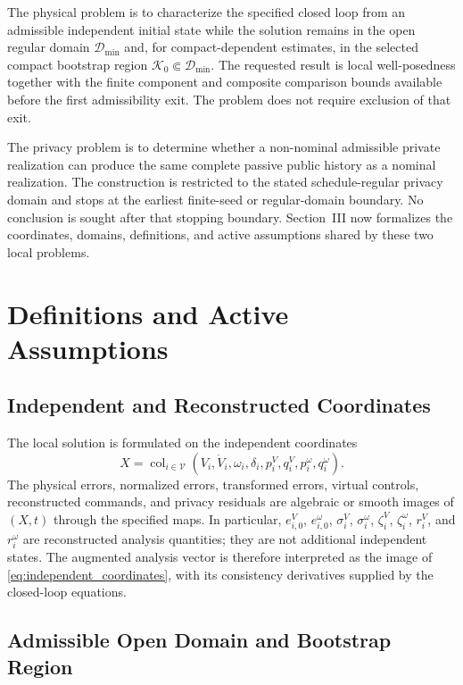 \documentclass[journal]{IEEEtran}
\begin{document}
The physical problem is to characterize the specified closed loop from an admissible independent initial state while the solution remains in the open regular domain $\mathcal D_{\min}$ and, for compact-dependent estimates, in the selected compact bootstrap region $\mathcal K_0\Subset\mathcal D_{\min}$. The requested result is local well-posedness together with the finite component and composite comparison bounds available before the first admissibility exit. The problem does not require exclusion of that exit.

The privacy problem is to determine whether a non-nominal admissible private realization can produce the same complete passive public history as a nominal realization. The construction is restricted to the stated schedule-regular privacy domain and stops at the earliest finite-seed or regular-domain boundary. No conclusion is sought after that stopping boundary. Section~III now formalizes the coordinates, domains, definitions, and active assumptions shared by these two local problems.

\section{Definitions and Active Assumptions}
\label{sec:definitions_assumptions}

\subsection{Independent and Reconstructed Coordinates}

The local solution is formulated on the independent coordinates
\begin{equation}
X=\operatorname{col}_{i\in\mathcal V}\!\left(V_i,\dot V_i,\omega_i,\delta_i,
p_i^V,q_i^V,p_i^\omega,q_i^\omega\right).
\label{eq:independent_coordinates}
\end{equation}
The physical errors, normalized errors, transformed errors, virtual controls,
reconstructed commands, and privacy residuals are algebraic or smooth images of
$(X,t)$ through the specified maps. In particular, $e_{i,0}^V$, $e_{i,0}^\omega$,
$\sigma_i^V$, $\sigma_i^\omega$, $\zeta_i^V$, $\zeta_i^\omega$, $r_i^V$,
and $r_i^\omega$ are reconstructed analysis quantities; they are not additional
independent states. The augmented analysis vector is
therefore interpreted as the image of \eqref{eq:independent_coordinates}, with
its consistency derivatives supplied by the closed-loop equations.

\subsection{Admissible Open Domain and Bootstrap Region}
\end{document}
